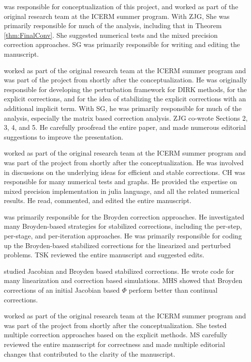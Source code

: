 \documentclass{siamart251104}
\begin{document}
 was responsible for conceptualization of this project, 
and worked as part of the original research team at the ICERM summer program.
With ZJG, She was primarily responsible for much of the analysis, 
including that in Theorem \ref{thm:FinalConv}. 
She suggested numerical tests and the mixed precision correction approaches.
SG was primarily responsible for writing and editing the manuscript.


 worked as part of the original 
research team at the ICERM summer program and was part of the project 
from shortly after the conceptualization. He was originally responsible 
for developing the perturbation  framework for DIRK methods, for the explicit 
corrections, and for  the idea of stabilizing the explicit corrections with an additional 
implicit term. With SG, he was primarily responsible for much of the analysis, especially 
the matrix based correction analysis. ZJG co-wrote Sections 2, 3, 4, and 5.
He carefully proofread the entire paper,  and made numerous editorial suggestions 
to improve the presentation.


worked as part of the original research team at the ICERM summer program
and was part of the project from shortly after the conceptualization.
He was  involved in discussions on the underlying ideas for efficient and stable corrections.
CH was responsible for many numerical tests and graphs.
He provided the expertise on mixed precision implementation in julia language, 
and all the related numerical results. He read, commented, and edited the entire manuscript.

 was primarily responsible for the Broyden correction
approaches. He investigated many Broyden-based strategies for stabilized corrections,
including the per-step, per-stage, and per-iteration approaches.
He was primarily responsible for coding up the Broyden-based stabilized 
corrections for the linearized and perturbed problems.
TSK reviewed the entire manuscript and  suggested edits.

studied Jacobian and Broyden based stabilized corrections. He 
wrote code for many linearization and correction based simulations.
MHS showed that Broyden corrections of an initial Jacobian based $\Phi$
perform better than continual corrections.


worked as part of the original research team at the ICERM summer program
and was part of the project from shortly after the conceptualization.
She tested multiple correction approaches based on the explicit methods.
MS carefully reviewed the entire manuscript for  correctness
and  made multiple editorial changes that contributed to the clarity of the 
manuscript.
\end{document}
